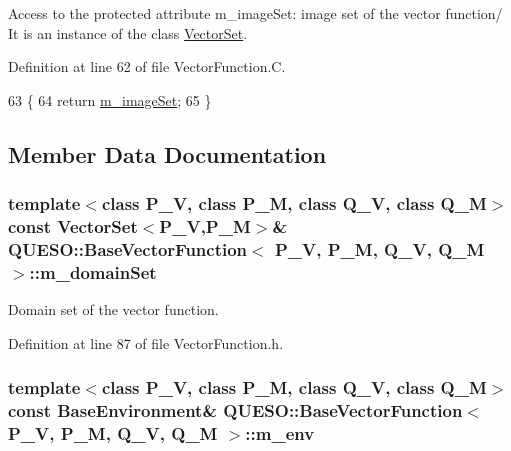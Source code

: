 Access to the protected attribute {\ttfamily m\-\_\-image\-Set\-:} image set of the vector function/ It is an instance of the class \hyperlink{class_q_u_e_s_o_1_1_vector_set}{Vector\-Set}. 



Definition at line 62 of file Vector\-Function.\-C.


\begin{DoxyCode}
63 \{
64   \textcolor{keywordflow}{return} \hyperlink{class_q_u_e_s_o_1_1_base_vector_function_a442585224e86695e302757c0fad17913}{m\_imageSet};
65 \}
\end{DoxyCode}


\subsection{Member Data Documentation}
\hypertarget{class_q_u_e_s_o_1_1_base_vector_function_a485d4d016534371775bb2b00b5a9f4d3}{
\subsubsection[{m\-\_\-domain\-Set}]{\setlength{\rightskip}{0pt plus 5cm}template$<$class P\-\_\-\-V, class P\-\_\-\-M, class Q\-\_\-\-V, class Q\-\_\-\-M$>$ const {\bf Vector\-Set}$<$P\-\_\-\-V,P\-\_\-\-M$>$\& {\bf Q\-U\-E\-S\-O\-::\-Base\-Vector\-Function}$<$ P\-\_\-\-V, P\-\_\-\-M, Q\-\_\-\-V, Q\-\_\-\-M $>$\-::m\-\_\-domain\-Set\hspace{0.3cm}{\ttfamily [protected]}}}\label{class_q_u_e_s_o_1_1_base_vector_function_a485d4d016534371775bb2b00b5a9f4d3}


Domain set of the vector function. 



Definition at line 87 of file Vector\-Function.\-h.

\hypertarget{class_q_u_e_s_o_1_1_base_vector_function_abb5487a1874515b698a3d5ee82490881}{
\subsubsection[{m\-\_\-env}]{\setlength{\rightskip}{0pt plus 5cm}template$<$class P\-\_\-\-V, class P\-\_\-\-M, class Q\-\_\-\-V, class Q\-\_\-\-M$>$ const {\bf Base\-Environment}\& {\bf Q\-U\-E\-S\-O\-::\-Base\-Vector\-Function}$<$ P\-\_\-\-V, P\-\_\-\-M, Q\-\_\-\-V, Q\-\_\-\-M $>$\-::m\-\_\-env\hspace{0.3cm}{\ttfamily [protected]}}}\label{class_q_u_e_s_o_1_1_base_vector_function_abb5487a1874515b698a3d5ee82490881}


